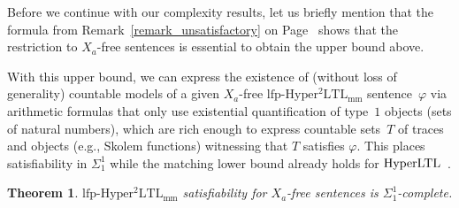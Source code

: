 \documentclass[dvipsnames,10pt,a4paper]{amsart}
\newtheorem{thm}{Theorem}[section]
\theoremstyle{definition}
\theoremstyle{remark}
\renewcommand{\phi}{\varphi}
\newcommand{\hyltl}{\mathrm{Hyper\-LTL}\xspace}
\newcommand{\lfpsohyltlfp}{\mathrm{lfp\text{-}{Hyper^2LTL_{\mathrm{mm}}}}\xspace}
\newcommand{\univar}{X_a}
\begin{document}
Before we continue with our complexity results, let us briefly mention that the formula from Remark~\ref{remark_unsatisfactory} on Page~\pageref{remark_unsatisfactory} shows that the restriction to $\univar$-free sentences is essential to obtain the upper bound above.

With this upper bound, we can express the existence of (without loss of generality) countable models of a given $\univar$-free $\lfpsohyltlfp$ sentence~$\phi$ via arithmetic formulas that only use existential quantification of type~$1$ objects (sets of natural numbers), which are rich enough to express countable sets~$T$ of traces and objects (e.g., Skolem functions) witnessing that $T$ satisfies $\phi$.
This places satisfiability in $\Sigma_1^1$ while the matching lower bound already holds for $\hyltl$~\cite{hyperltlsatconf}.

\begin{thm}\label{thm_lfpsatcomplexity}
$\lfpsohyltlfp$ satisfiability for $\univar$-free sentences is $\Sigma_1^1$-complete.
\end{thm}
\end{document}
